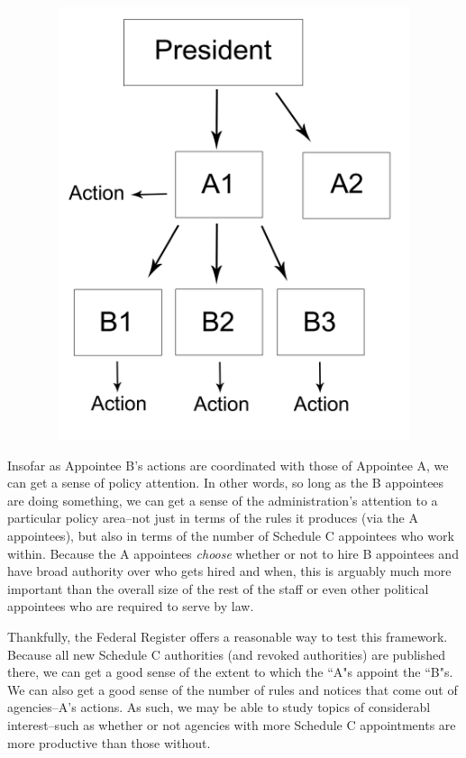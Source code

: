 \documentclass[12pt]{article}
\begin{document}
\begin{figure}
\centering
\includegraphics[height=5in,width=4.5in]{ModelV3.pdf}
\end{figure}

Insofar as Appointee B's actions are coordinated with those of Appointee A, we can get a sense of policy attention. In other words, so long as the B appointees are doing something, we can get a sense of the administration's attention to a particular policy area--not just in terms of the rules it produces (via the A appointees), but also in terms of the number of Schedule C appointees who work within. Because the A appointees \textit{choose} whether or not to hire B appointees and have broad authority over who gets hired and when, this is arguably much more important than the overall size of the rest of the staff or even other political appointees who are required to serve by law.

Thankfully, the Federal Register offers a reasonable way to test this framework. Because all new Schedule C authorities (and revoked authorities) are published there, we can get a good sense of the extent to which the ``A"s appoint the ``B"s. We can also get a good sense of the number of rules and notices that come out of agencies--A's actions. As such, we may be able to study topics of considerabl interest--such as whether or not agencies with more Schedule C appointments are more productive than those without. 
\end{document}
